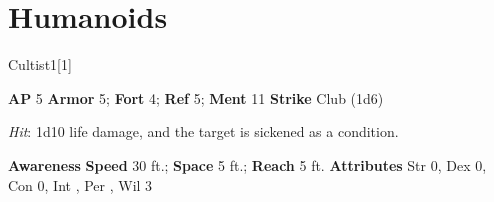 \section{Humanoids}
\begin{monsection}{Cultist}{1}[1]
\vspace{-1em}\vspace{-1em}
\begin{spellcontent}
\begin{spelltargetinginfo}
{\textbf{AP} 5}
\pari \textbf{Armor} 5;
\textbf{Fort} 4;
\textbf{Ref} 5;
\textbf{Ment} 11
\pari \textbf{Strike} Club  (1d6)
\end{spelltargetinginfo}
\begin{spelleffects}
\pari
{}
\par
\par \textit{Hit}: 1d10 life damage, and the target is sickened as a condition.
\end{spelleffects}
\end{spellcontent}
\begin{spellsubcontent}
\begin{spellfooter}
\pari \textbf{Awareness} 
\pari \textbf{Speed} 30 ft.;
\textbf{Space} 5 ft.;
\textbf{Reach} 5 ft.
\pari \textbf{Attributes}
Str 0,
Dex 0,
Con 0,
Int ,
Per ,
Wil 3
\end{spellfooter}
\end{spellsubcontent}
\end{monsection}
